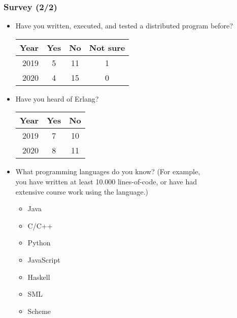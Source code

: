 \begin{frame}

\frametitle{Survey (2/2)}

\begin{itemize}

\footnotesize

\item Have you written, executed, and tested a distributed program before?

\begin{tabular}{|r|c|c|c|}
\hline
\textbf{Year} & \textbf{Yes} & \textbf{No} & \textbf{Not sure}
\\\hline
2019 & 5 & 11 & 1 \\\hline
2020 & 4 & 15 & 0 \\\hline
\end{tabular}

\item Have you heard of Erlang?

\begin{tabular}{|r|c|c|}
\hline
\textbf{Year} & \textbf{Yes} & \textbf{No}
\\\hline
2019 & 7 & 10 \\\hline
2020 & 8 & 11 \\\hline
\end{tabular}

\item What programming languages do you know? (For example,\\ you have
written at least 10.000 lines-of-code, or have had\\ extensive course
work using the language.)

\begin{multicols}{2}
\begin{itemize}

\item Java

\item C/C++

\item Python

\item JavaScript

\item Haskell

\item SML

\item Scheme

\end{itemize}
\end{multicols}

\end{itemize}

\end{frame}
